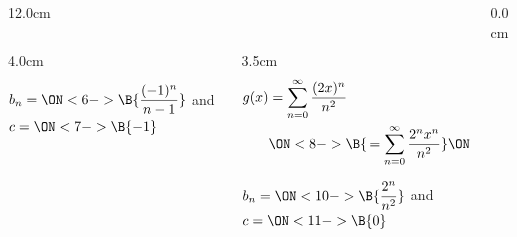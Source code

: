 \begin{frame}
\begin{columns}
\begin{column}{12.0cm}
\begin{columns}
\begin{column}{4.0cm}
	\vspace{0.2cm}
	
	$b_{n} = \ON<6->{\B{\displaystyle{\frac{(-1)^n}{n - 1}}}}$ \quad and \quad $c = \ON<7->{\B{-1}}$

	\vspace{1.2cm}
	
\end{column}
\begin{column}{3.5cm}
	\begin{align*}
		g(x) &= \sum \limits_{n=0}^{\infty} \frac{(2x)^n}{n^2} \\
		&\ON<8->{\B{\, = \sum \limits_{n=0}^{\infty} \frac{2^n x^n}{n^2}}} \ON<9->{\B{\, = \sum \limits_{n=0}^{\infty} \frac{2^n}{n^2}x^n}}
	\end{align*}
	
	\vspace{0.2cm}
	
	$b_{n} = \ON<10->{\B{\displaystyle{\frac{2^n}{n^2}}}}$ \quad and \quad $c = \ON<11->{\B{0}}$

	\vspace{1.2cm}
	
\end{column}
\end{columns}

\end{column}
\begin{column}{0.0cm}\end{column}
\end{columns}
\end{frame}

